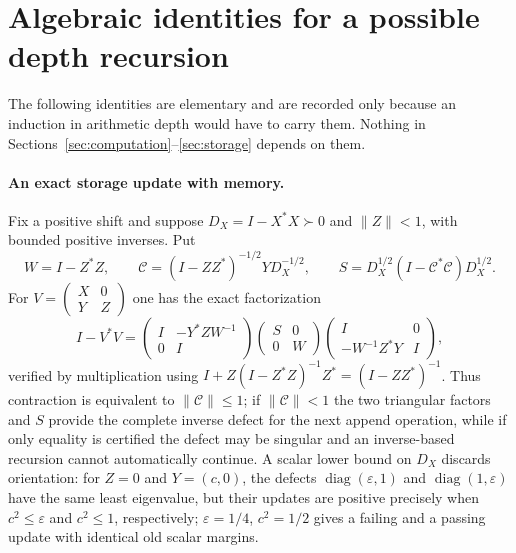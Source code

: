 \documentclass[11pt]{article}
\numberwithin{equation}{section}
\theoremstyle{definition}
\theoremstyle{remark}
\newcommand{\norm}[1]{\lVert#1\rVert}
\begin{document}
\section{Algebraic identities for a possible depth recursion}\label{app:recursion}

The following identities are elementary and are recorded only because an
induction in arithmetic depth would have to carry them. Nothing in
Sections~\ref{sec:computation}--\ref{sec:storage} depends on them.

\paragraph{An exact storage update with memory.}
Fix a positive shift and suppose $D_X=I-X^*X\succ0$ and $\norm Z<1$,
with bounded positive inverses. Put
\[
 W=I-Z^*Z,\qquad
 \mathcal C=(I-ZZ^*)^{-1/2}YD_X^{-1/2},\qquad
 S=D_X^{1/2}(I-\mathcal C^*\mathcal C)D_X^{1/2}.
\]
For $V=\left(\begin{smallmatrix}X&0\\Y&Z\end{smallmatrix}\right)$ one has
the exact factorization
\begin{equation}\label{eq:storage-factor}
 I-V^*V=
 \begin{pmatrix}I&-Y^*ZW^{-1}\\0&I\end{pmatrix}
 \begin{pmatrix}S&0\\0&W\end{pmatrix}
 \begin{pmatrix}I&0\\-W^{-1}Z^*Y&I\end{pmatrix},
\end{equation}
verified by multiplication using $I+Z(I-Z^*Z)^{-1}Z^*=(I-ZZ^*)^{-1}$.
Thus contraction is equivalent to $\norm{\mathcal C}\le1$; if
$\norm{\mathcal C}<1$ the two triangular factors and $S$ provide the complete
inverse defect for the next append operation, while if only equality is
certified the defect may be singular and an inverse-based recursion cannot
automatically continue. A scalar lower bound on $D_X$ discards orientation:
for $Z=0$ and $Y=(c,0)$, the defects $\operatorname{diag}(\varepsilon,1)$ and
$\operatorname{diag}(1,\varepsilon)$ have the same least eigenvalue, but their
updates are positive precisely when $c^2\le\varepsilon$ and $c^2\le1$,
respectively; $\varepsilon=1/4$, $c^2=1/2$ gives a failing and a passing
update with identical old scalar margins.
\end{document}
